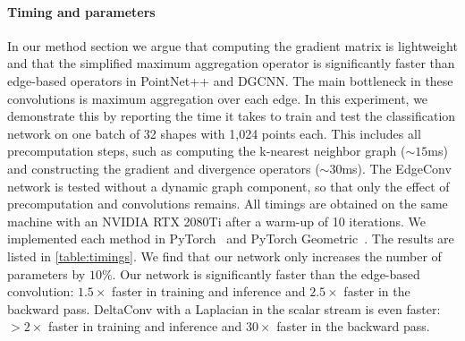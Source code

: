 \documentclass[acmtog, authorversion]{acmart}
\begin{document}
\begin{table}[t]
\end{table} \begin{table}[b]
    \caption{Timing and parameter counts for classification on ModelNet40. The timing for training and inference includes all necessary precomputations.}
    \label{table:timings}
    \begin{center}
    \end{center}
\end{table} 
\paragraph*{Timing and parameters} In our method section we argue that computing the gradient matrix is lightweight and that the simplified maximum aggregation operator is significantly faster than edge-based operators in PointNet++ and DGCNN. The main bottleneck in these convolutions is maximum aggregation over each edge. In this experiment, we demonstrate this by reporting the time it takes to train and test the classification network on one batch of 32 shapes with 1,024 points each. This includes all precomputation steps, such as computing the k-nearest neighbor graph ($\sim15$ms) and constructing the gradient and divergence operators ($\sim30$ms). The EdgeConv network is tested without a dynamic graph component, so that only the effect of precomputation and convolutions remains. All timings are obtained on the same machine with an NVIDIA RTX 2080Ti after a warm-up of 10 iterations. We implemented each method in PyTorch~\cite{pytorch} and PyTorch Geometric~\cite{Fey/Lenssen/2019}.
The results are listed in \autoref{table:timings}. We find that our network only increases the number of parameters by $10\%$. Our network is significantly faster than the edge-based convolution: $1.5\times$ faster in training and inference and $2.5\times$ faster in the backward pass. DeltaConv with a Laplacian in the scalar stream is even faster: $>2\times$ faster in training and inference and $30\times$ faster in the backward pass.
\end{document}
